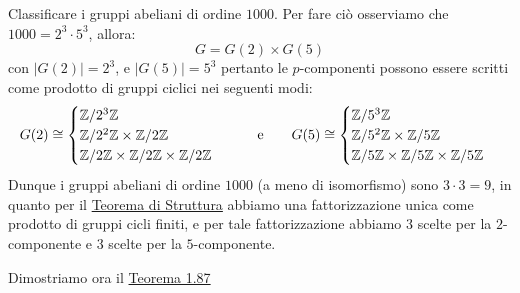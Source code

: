 \documentclass[11pt]{scrartcl}
\begin{document}
\begin{example}
    Classificare i gruppi abeliani di ordine $1000$. Per fare ciò osserviamo che $1000 = 2^3 \cdot 5^3$, allora:
    \[  G = G(2) \times G(5)
        \]
    con $|G(2)| = 2^3$, e $|G(5)| = 5^3$ pertanto le $p$-componenti possono essere scritti come prodotto di gruppi ciclici nei seguenti modi:
    \[ G(2) \cong \begin{cases}
                    \mathbb{Z}/{2^3}\mathbb{Z} \\
                    \mathbb{Z}/{2^2}\mathbb{Z} \times \mathbb{Z}/{2}\mathbb{Z} \\
                    \mathbb{Z}/{2}\mathbb{Z} \times \mathbb{Z}/{2}\mathbb{Z} \times \mathbb{Z}/{2}\mathbb{Z}
                \end{cases}
    \qquad \text e \qquad
    G(5) \cong \begin{cases}
        \mathbb{Z}/{5^3}\mathbb{Z} \\
        \mathbb{Z}/{5^2}\mathbb{Z} \times \mathbb{Z}/{5}\mathbb{Z} \\
        \mathbb{Z}/{5}\mathbb{Z} \times \mathbb{Z}/{5}\mathbb{Z} \times \mathbb{Z}/{5}\mathbb{Z}
    \end{cases}
        \]
    Dunque i gruppi abeliani di ordine $1000$ (a meno di isomorfismo) sono $3\cdot 3 = 9$, in quanto per il \hyperref[t:struttura]{Teorema di Struttura} abbiamo
    una fattorizzazione unica come prodotto di gruppi cicli finiti, e per tale fattorizzazione abbiamo $3$ scelte per la $2$-componente e $3$ scelte per la $5$-componente.
\end{example}

Dimostriamo ora il \hyperref[t:t1]{Teorema 1.87}
\end{document}
